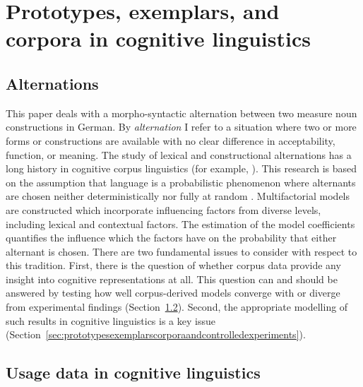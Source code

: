 \section{Prototypes, exemplars, and corpora in cognitive linguistics}
\label{sec:cogocl}

\subsection{Alternations}
\label{sec:alternations}

This paper deals with a morpho-syntactic alternation between two measure noun constructions in German.
By \textit{alternation} I refer to a situation where two or more forms or constructions are available with no clear difference in acceptability, function, or meaning.
The study of lexical and constructional alternations has a long history in cognitive corpus linguistics (for example, \citealp{BresnanEa2007,BresnanHay2010,BresnanFord2010,DivjakArppe2013,Gries2015,NessetJanda2010}).
This research is based on the assumption that language is a probabilistic phenomenon where alternants are chosen neither deterministically nor fully at random \citep{Bresnan2007}.
Multifactorial models are constructed which incorporate influencing factors from diverse levels, including lexical and contextual factors.
The estimation of the model coefficients quantifies the influence which the factors have on the probability that either alternant is chosen.
There are two fundamental issues to consider with respect to this tradition.
First, there is the question of whether corpus data provide any insight into cognitive representations at all.
This question can and should be answered by testing how well corpus-derived models converge with or diverge from experimental findings (Section~\ref{sec:usagedataincognitivelinguistics}).
Second, the appropriate modelling of such results in cognitive linguistics is a key issue (Section~\ref{sec:prototypesexemplarscorporaandcontrolledexperiments}).

\subsection{Usage data in cognitive linguistics}
\label{sec:usagedataincognitivelinguistics}

